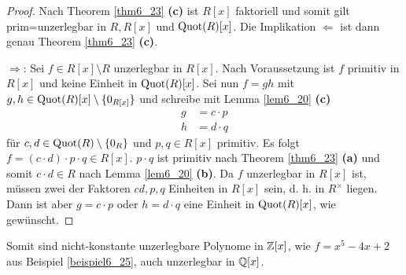 \begin{proof}
	Nach Theorem \ref{thm6_23} \textbf{(c)} ist $R[x]$ faktoriell und somit gilt \glqq{}prim=unzerlegbar\grqq{ } in $R, R[x]$ und $\mathrm{Quot}(R)[x]$. Die Implikation \glqq{}$\Leftarrow$\grqq{ } ist dann genau Theorem \ref{thm6_23} \textbf{(c)}. 
	
	\glqq{}$\Rightarrow$\grqq: Sei $f \in R[x] \setminus R$ unzerlegbar in $R[x]$. Nach Voraussetzung ist $f$ primitiv in $R[x]$ und keine Einheit in $\mathrm{Quot}(R)[x]$. Sei nun $f = gh$ mit $g,h \in \mathrm{Quot}(R)[x] \setminus \{0_{R[x]}\}$ und schreibe mit Lemma \ref{lem6_20} \textbf{(c)} 
	\begin{align*}
		g &= c \cdot p\\
		h &= d \cdot q
	\end{align*}
	für $c,d \in \mathrm{Quot}(R)\setminus\{0_R\}$ und $p,q \in R[x]$ primitiv. Es folgt $f = (c \cdot d) \cdot p \cdot q \in R[x]$. $p\cdot q$ ist primitiv nach Theorem \ref{thm6_23} \textbf{(a)} und somit $c \cdot d \in R$ nach Lemma \ref{lem6_20} \textbf{(b)}. Da $f$ unzerlegbar in $R[x]$ ist, müssen zwei der Faktoren $cd, p, q$ Einheiten in $R[x]$ sein, d. h. in $R^\times$ liegen. Dann ist aber $g = c\cdot p$ oder $h = d \cdot q$ eine Einheit in $\mathrm{Quot}(R)[x]$, wie gewünscht.
\end{proof}

Somit sind nicht-konstante unzerlegbare Polynome in $\mathbb{Z}[x]$, wie $f = x^5 - 4x + 2$ aus Beispiel \ref{beispiel6_25}, auch unzerlegbar in $\mathbb{Q}[x]$.

